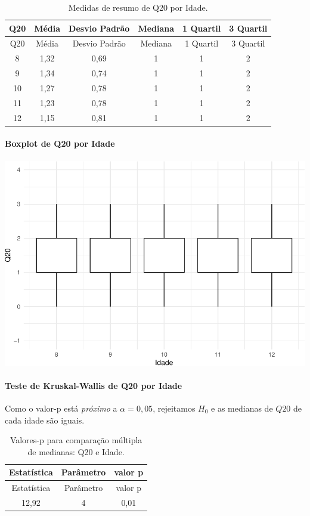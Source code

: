 \documentclass[]{article}
\let\oldparagraph\paragraph
\renewcommand{\paragraph}[1]{\oldparagraph{#1}\mbox{}}
\begin{document}
\begin{longtable}[]{@{}cccccc@{}}
\caption{\label{tab:unnamed-chunk-305}Medidas de resumo de Q20 por Idade.}\tabularnewline
\toprule
Q20 & Média & Desvio Padrão & Mediana & 1 Quartil & 3 Quartil\tabularnewline
\midrule
\endfirsthead
\toprule
Q20 & Média & Desvio Padrão & Mediana & 1 Quartil & 3 Quartil\tabularnewline
\midrule
\endhead
8 & 1,32 & 0,69 & 1 & 1 & 2\tabularnewline
9 & 1,34 & 0,74 & 1 & 1 & 2\tabularnewline
10 & 1,27 & 0,78 & 1 & 1 & 2\tabularnewline
11 & 1,23 & 0,78 & 1 & 1 & 2\tabularnewline
12 & 1,15 & 0,81 & 1 & 1 & 2\tabularnewline
\bottomrule
\end{longtable}

\hypertarget{boxplot-de-q20-por-idade}{%
\paragraph{Boxplot de Q20 por Idade}\label{boxplot-de-q20-por-idade}}

\begin{center}\includegraphics[width=0.75\linewidth]{relatorio_files/figure-latex/unnamed-chunk-306-1} \end{center}

\hypertarget{teste-de-kruskal-wallis-de-q20-por-idade}{%
\paragraph{Teste de Kruskal-Wallis de Q20 por Idade}\label{teste-de-kruskal-wallis-de-q20-por-idade}}

Como o valor-p está \emph{próximo} a \(\alpha=0,05\), rejeitamos \(H_0\) e as medianas de \(Q20\) de cada idade são iguais.

\begin{longtable}[]{@{}ccc@{}}
\caption{\label{tab:unnamed-chunk-307}Valores-p para comparação múltipla de medianas: Q20 e Idade.}\tabularnewline
\toprule
Estatística & Parâmetro & valor p\tabularnewline
\midrule
\endfirsthead
\toprule
Estatística & Parâmetro & valor p\tabularnewline
\midrule
\endhead
12,92 & 4 & 0,01\tabularnewline
\bottomrule
\end{longtable}
\end{document}
